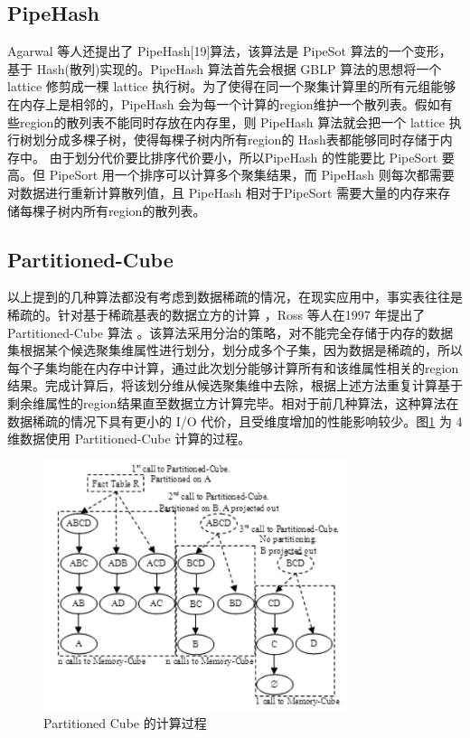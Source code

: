 \subsection{PipeHash}

Agarwal 等人还提出了 PipeHash[19]算法，该算法是 PipeSot 算法的一个变形，基于 Hash(散列)实现的。PipeHash 算法首先会根据 GBLP 算法的思想将一个 lattice 修剪成一棵 lattice 执行树。为了使得在同一个聚集计算里的所有元组能够在内存上是相邻的，PipeHash 会为每一个计算的region维护一个散列表。假如有些region的散列表不能同时存放在内存里，则 PipeHash 算法就会把一个 lattice 执行树划分成多棵子树，使得每棵子树内所有region的 Hash表都能够同时存储于内存中。 由于划分代价要比排序代价要小，所以PipeHash 的性能要比 PipeSort 要高。但 PipeSort 用一个排序可以计算多个聚集结果，而 PipeHash 则每次都需要对数据进行重新计算散列值，且 PipeHash 相对于PipeSort 需要大量的内存来存储每棵子树内所有region的散列表。

\subsection{Partitioned-Cube}

以上提到的几种算法都没有考虑到数据稀疏的情况，在现实应用中，事实表往往是稀疏的。针对基于稀疏基表的数据立方的计算 ，Ross 等人在1997 年提出了 Partitioned-Cube 算法 \cite{ross1997fast}。该算法采用分治的策略，对不能完全存储于内存的数据集根据某个候选聚集维属性进行划分，划分成多个子集，因为数据是稀疏的，所以每个子集均能在内存中计算，通过此次划分能够计算所有和该维属性相关的region结果。完成计算后，将该划分维从候选聚集维中去除，根据上述方法重复计算基于剩余维属性的region结果直至数据立方计算完毕。相对于前几种算法，这种算法在数据稀疏的情况下具有更小的 I/O 代价，且受维度增加的性能影响较少。图\ref{partitioned_cube} 为 4 维数据使用 Partitioned-Cube 计算的过程。

\begin{figure}[!htb]
\centering\includegraphics[width=3.5in]{picture/ch_current_research/partitioned_cube} 
\caption{Partitioned Cube 的计算过程}\label{partitioned_cube} 
\end{figure} 

